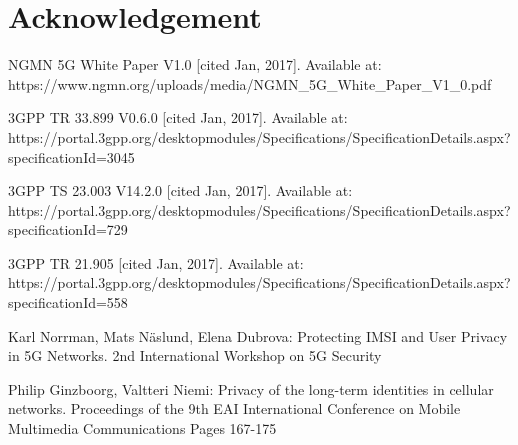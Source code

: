 \documentclass[lnicst,sechang,a4paper]{svmultln}
\begin{document}
\section{Acknowledgement}
\label{sec:acknowledgement}



\begin{thebibliography}{4}

 NGMN 5G White Paper V1.0 [cited Jan, 2017]. Available at: https://www.ngmn.org/uploads/media/NGMN\_5G\_White\_Paper\_V1\_0.pdf

 3GPP TR 33.899 V0.6.0 [cited Jan, 2017]. Available at: https://portal.3gpp.org/desktopmodules/Specifications/SpecificationDetails.aspx?\\specificationId=3045

 3GPP TS 23.003 V14.2.0 [cited Jan, 2017]. Available at: https://portal.3gpp.org/desktopmodules/Specifications/SpecificationDetails.aspx?\\specificationId=729

 3GPP TR 21.905 [cited Jan, 2017]. Available at: https://portal.3gpp.org/desktopmodules/Specifications/SpecificationDetails.aspx?\\specificationId=558


 Karl Norrman, Mats N\"aslund, Elena Dubrova: Protecting IMSI and User Privacy in 5G Networks. 2nd International Workshop on 5G Security

 Philip Ginzboorg,  Valtteri Niemi: Privacy of the long-term identities in cellular networks. Proceedings of the 9th EAI International Conference on Mobile Multimedia Communications
Pages 167-175




\end{thebibliography}
\end{document}
